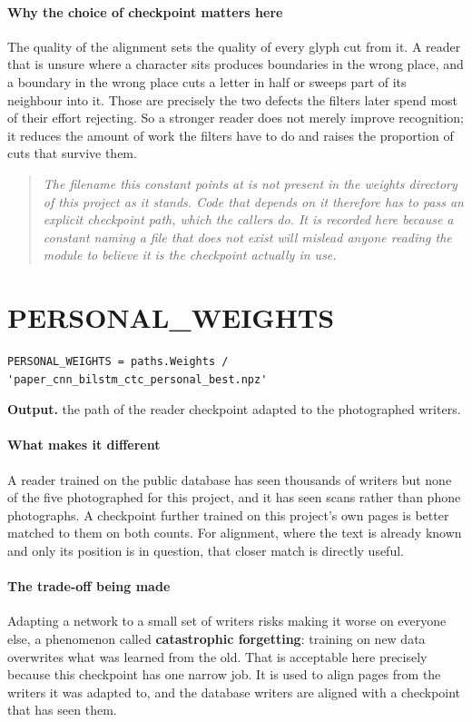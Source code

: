\paragraph{Why the choice of checkpoint matters here}
The quality of the alignment sets the quality of every glyph cut from it. A reader that is unsure where a character sits produces boundaries in the wrong place, and a boundary in the wrong place cuts a letter in half or sweeps part of its neighbour into it. Those are precisely the two defects the filters later spend most of their effort rejecting. So a stronger reader does not merely improve recognition; it reduces the amount of work the filters have to do and raises the proportion of cuts that survive them.


\begin{quote}\small\itshape The filename this constant points at is not present in the weights directory of this project as it stands. Code that depends on it therefore has to pass an explicit checkpoint path, which the callers do. It is recorded here because a constant naming a file that does not exist will mislead anyone reading the module to believe it is the checkpoint actually in use.\end{quote}

\section{PERSONAL\_WEIGHTS}
\begin{lstlisting}[style=sig]
PERSONAL_WEIGHTS = paths.Weights / 'paper_cnn_bilstm_ctc_personal_best.npz'
\end{lstlisting}

\noindent\textbf{Output.} the path of the reader checkpoint adapted to the photographed writers.


\paragraph{What makes it different}
A reader trained on the public database has seen thousands of writers but none of the five photographed for this project, and it has seen scans rather than phone photographs. A checkpoint further trained on this project's own pages is better matched to them on both counts. For alignment, where the text is already known and only its position is in question, that closer match is directly useful.


\paragraph{The trade-off being made}
Adapting a network to a small set of writers risks making it worse on everyone else, a phenomenon called \textbf{catastrophic forgetting}: training on new data overwrites what was learned from the old. That is acceptable here precisely because this checkpoint has one narrow job. It is used to align pages from the writers it was adapted to, and the database writers are aligned with a checkpoint that has seen them.



